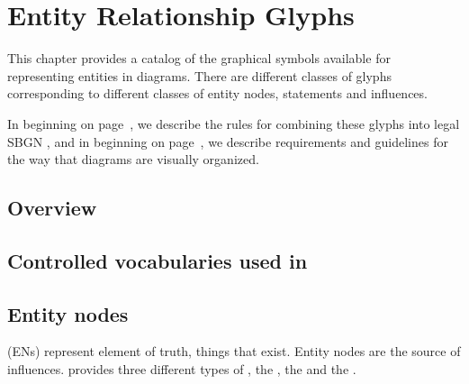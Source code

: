 
\chapter{Entity Relationship Glyphs}
\label{chp:glyph}

This chapter provides a catalog of the graphical symbols available for representing entities in \ER diagrams.  There are different classes of glyphs corresponding to different classes of entity nodes, statements and influences.

In  beginning on page~\pageref{chp:grammar}, we describe the rules for combining these glyphs into legal SBGN \ERs, and in  beginning on page~\pageref{chp:layout}, we describe requirements and guidelines for the way that diagrams are visually organized.

\section{Overview}
 

 
\section{Controlled vocabularies used in \SBGNERLone}\label{sec:CVs}


 
 
\section{Entity nodes}\label{sec:ENs}

 (ENs) represent element of truth, things that exist. 
Entity nodes are the source of influences. \SBGNERLone{} provides three different types of , the , the  and the . 

